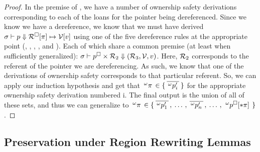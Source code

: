 \begin{proof}
  In the premise of , we have a number of ownership safety
  derivations corresponding to each of the loans for the pointer being
  dereferenced. Since we know we have a dereference, we know that we must have
  derived $ \sigma \vdash p \Downarrow \mathcal{R}^\square[\pi] \mapsto \mathcal{V} [v] $
  using one of the five dereference rules at the appropriate point
  (, ,
  , , and
  ). Each of which share a common premise (at least
  when sufficiently generalized):
  $ \sigma \vdash p^\square \times \mathcal{R}_2 \Downarrow (\mathcal{R}_3, \mathcal{V}, v) $. Here, $\mathcal{R}_2$ corresponds to
  the referent of the pointer we are dereferencing. As such, we know that one of
  the derivations of ownership safety corresponds to that particular referent.
  So, we can apply our induction hypothesis and get that
  $\,^{\omega}\pi\, \in \{ \: 
    \overline{\,^{\omega}p^\prime_i\,}  \: \}$ for the appropriate
  ownership safety derivation numbered i. The final output is the union of all
  of these sets, and thus we can generalize to $\,^{\omega}\pi\,
  \in \{ \:  \overline{\,^{\omega}p^\prime_1\,} \, , \: \ldots \, , \:
    \overline{\,^{\omega}p^\prime_n\,} \, , \: \ldots \, , \:
    \,^{\omega}p^\square[* \pi]\, \: \}$.
\end{proof}

\subsection{Preservation under Region Rewriting Lemmas}
\label{sec:rewriting-lemmas}

